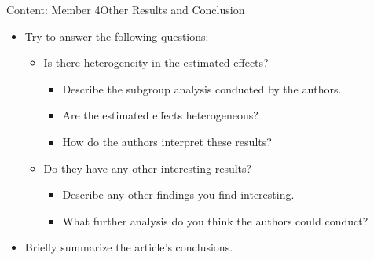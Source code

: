 \documentclass[hyperref={pdfpagelabels=false,hidelinks}]{beamer}
\begin{document}
\begin{frame}{Content: Member 4}{Other Results and Conclusion}
	\begin{itemize}
		\item Try to answer the following questions:
															\vspace{0.2cm}
		\begin{itemize}
			\item Is there heterogeneity in the estimated effects?
																\vspace{0.2cm}
			\begin{itemize}
				\item Describe the subgroup analysis conducted by the authors.
																	\vspace{0.2cm}
				\item Are the estimated effects heterogeneous?
																	\vspace{0.2cm}
				\item How do the authors interpret these results?
																	\vspace{0.2cm}
			\end{itemize}
			\item Do they have any other interesting results?
																\vspace{0.2cm}
			\begin{itemize}
				\item Describe any other findings you find interesting.
																	\vspace{0.2cm}
				\item What further analysis do you think the authors could conduct?
																	\vspace{0.2cm}
			\end{itemize}
		\end{itemize}
		\item Briefly summarize the article's conclusions.
	\end{itemize}
\end{frame}
\end{document}
